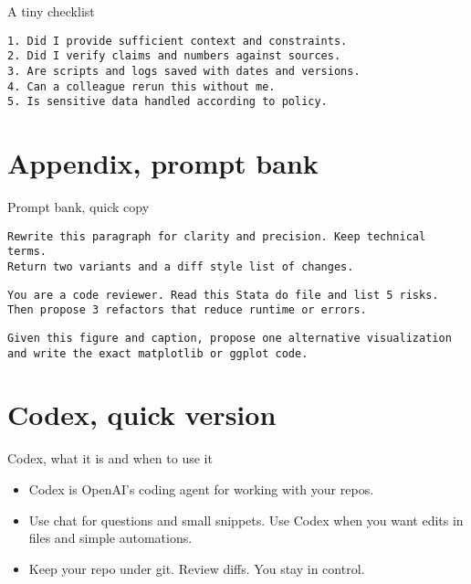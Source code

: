 \documentclass[aspectratio=169,professionalfonts]{beamer}
\begin{document}
\begin{frame}[fragile]{A tiny checklist}
\begin{verbatim}
1. Did I provide sufficient context and constraints.
2. Did I verify claims and numbers against sources.
3. Are scripts and logs saved with dates and versions.
4. Can a colleague rerun this without me.
5. Is sensitive data handled according to policy.
\end{verbatim}
\end{frame}

\section{Appendix, prompt bank}

\begin{frame}[fragile]{Prompt bank, quick copy}
\begin{verbatim}
Rewrite this paragraph for clarity and precision. Keep technical terms.
Return two variants and a diff style list of changes.
\end{verbatim}

\begin{verbatim}
You are a code reviewer. Read this Stata do file and list 5 risks.
Then propose 3 refactors that reduce runtime or errors.
\end{verbatim}

\begin{verbatim}
Given this figure and caption, propose one alternative visualization
and write the exact matplotlib or ggplot code.
\end{verbatim}
\end{frame}

\section{Codex, quick version}

\begin{frame}{Codex, what it is and when to use it}
  \begin{itemize}
    \item Codex is OpenAI's coding agent for working with your repos.
    \item Use chat for questions and small snippets. Use Codex when you want edits in files and simple automations.
    \item Keep your repo under git. Review diffs. You stay in control.
  \end{itemize}
\end{frame}
\end{document}
